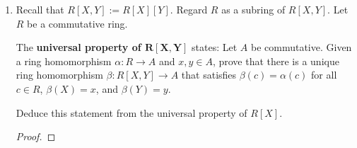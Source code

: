 \documentclass[../psets.tex]{subfiles}
\begin{document}
\begin{enumerate}
\begin{proof}


        Let $I$ be an arbitrary nonzero ideal in $F[[X]]$, let $n$ be the lowest power present in any polynomial in $I$, and let $f\in I$ be a polynomial with a nonzero $X^n$ term. Since $a_n\neq 0$, $f/X^n$ is a polynomial with nonzero constant term $a_n$. Additionally, since $a_n$ is a nonzero element of a field, $a_n$ is a unit. It follows by Exercise 7.2.3c that $f/X^n$ is a unit. Thus, there exists $u\in R$ such that $u\times(f/X^n)=1$. Multiplying through this equation by $X^n$ yields
        \begin{equation*}
            uf = X^n
        \end{equation*}
        Since $f\in I$ and $u\in F[[X]]$, $uf\in I$, so $X^n=uf\in I$. Multiplying any polynomial in $F[[X]]$ by the monic polynomial $X^n$ can only increase the exponent of every term, so, to reiterate, there are no polynomials in $I$ having terms with exponents less than $n$. Moreover, it follows by the Euclidean algorithm that every polynomial $h$ with all terms having powers greater than or equal to $n$ can be expressed as the product of some $q\in F[[X]]$ and $X^n$. Therefore, $I=(X^n)$.
    \end{proof}
    \item Recall that $R[X,Y]:=R[X][Y]$. Regard $R$ as a subring of $R[X,Y]$. Let $R$ be a commutative ring.\par
    The \textbf{universal property of $\bm{R[X,Y]}$} states: Let $A$ be commutative. Given a ring homomorphism $\alpha:R\to A$ and $x,y\in A$, prove that there is a unique ring homomorphism $\beta:R[X,Y]\to A$ that satisfies $\beta(c)=\alpha(c)$ for all $c\in R$, $\beta(X)=x$, and $\beta(Y)=y$.\par
    Deduce this statement from the universal property of $R[X]$.
    \begin{proof}

\end{proof}
\end{enumerate}
\end{document}
